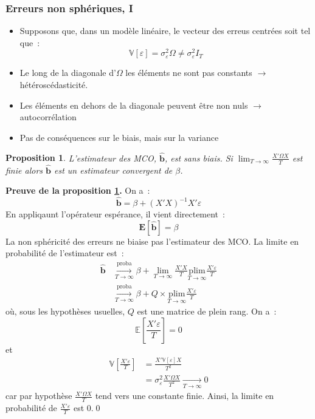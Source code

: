 \documentclass[10pt]{beamer}
\newcommand{\plim}{\overset{\text{proba}}{\underset{T\rightarrow\infty}{\longrightarrow}}}
\theoremstyle{plain}
\newtheorem{prop}{Proposition}
\begin{document}
\begin{frame}
  \frametitle{Erreurs non sphériques, I}

  \begin{itemize}

  \item Supposons que, dans un modèle linéaire, le vecteur des erreus centrées soit tel que~:
    \[
      \mathbb V[\varepsilon] = \sigma_{\varepsilon}^2\Omega \neq \sigma_{\varepsilon}^2 I_T
    \]

  \item Le long de la diagonale d'$\Omega$ les éléments ne sont pas constants $\rightarrow$ hétéroscédasticité.\newline

  \item Les éléments en dehors de la diagonale peuvent être non nuls $\rightarrow$ autocorrélation\newline

  \item Pas de conséquences sur le biais, mais sur la variance

  \end{itemize}


  \begin{prop}\label{prop:bhat:non-spherical-errors-1}
    L'estimateur des MCO, $\hat{\textbf{b}}$, est sans biais. Si $\lim_{T\rightarrow\infty}\frac{X'\Omega X}{T}$ est finie alors $\hat{\textbf{b}}$ est un estimateur convergent de $\beta$.
  \end{prop}

\end{frame}


\begin{notes}

  \textbf{Preuve de la proposition \ref{prop:bhat:non-spherical-errors-1}.} On a~:
  \[
    \hat{\textbf{b}} = \beta + (X'X)^{-1}X'\varepsilon
  \]
  En appliqaunt l'opérateur espérance, il vient directement~:
  \[
    \mathbf E[\hat{\textbf{b}}] = \beta
  \]
  La non sphéricité des erreurs ne biaise pas l'estimateur des MCO. La limite en probabilité de l'estimateur est~:
  \[
    \begin{split}
      \hat{\textbf{b}} &\plim \beta + \lim_{T\rightarrow\infty}\frac{X'X}{T}\underset{T\rightarrow\infty}{\text{plim}}\frac{X'\varepsilon}{T}\\
      &\plim \beta + Q\times \underset{T\rightarrow\infty}{\text{plim}}\frac{X'\varepsilon}{T}
    \end{split}
  \]
  où, sous les hypothèses usuelles, $Q$ est une matrice de plein rang. On a~:
  \[
    \mathbb E\left[\frac{X'\varepsilon}{T}\right] = 0
  \]
  et
  \[
    \begin{split}
      \mathbb V\left[\frac{X'\varepsilon}{T}\right] &= \frac{X'\mathbb V[\varepsilon]X}{T^2}\\
                                                    &= \sigma_{\varepsilon}^2\frac{X'\Omega X}{T^2} \underset{T\rightarrow\infty}{\longrightarrow} 0
    \end{split}
  \]
  car par hypothèse $\frac{X'\Omega X}{T}$ tend vers une constante finie. Ainsi, la limite en probabilité de $\frac{X'\varepsilon}{T}$ est 0.\qed
\end{notes}
\end{document}
